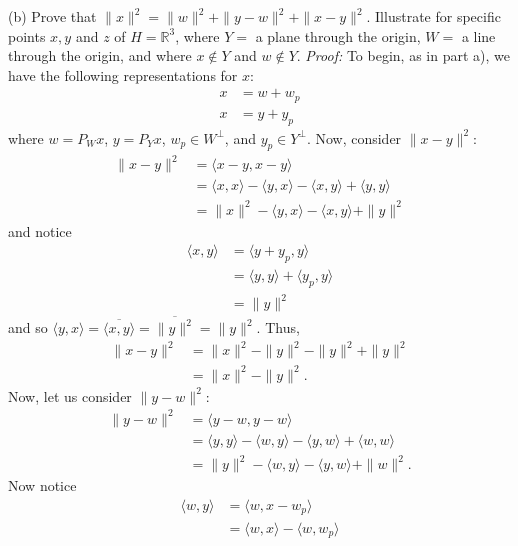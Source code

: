 \documentclass{article}
\begin{document}
\begin{itemize}
    
    (b) Prove that $\|x\|^2 = \|w\|^2 + \|y - w\|^2 + \|x - y\|^2$. Illustrate for specific points $x,y$ and $z$ of $H = \mathbb{R}^3$, where $Y = $ a plane through the origin, $W = $ a line through the origin, and where $x \notin Y$ and $w \notin Y$.
    \newline\newline
    \textit{Proof:} To begin, as in part a), we have the following representations for $x$:
    \begin{align*}
        x &= w + w_p\\
        x &= y + y_p
    \end{align*}
    where $w = P_Wx$, $y = P_Yx$, $w_p \in W^{\perp}$, and $y_p \in Y^{\perp}$. Now, consider $\|x - y\|^2$:
    \begin{align*}
        \|x - y\|^2 &= \langle x - y, x - y\rangle\\
        &= \langle x, x\rangle - \langle y, x\rangle - \langle x,y \rangle + \langle y, y \rangle\\
        &= \|x\|^2 - \langle y, x\rangle - \langle x, y\rangle + \|y\|^2
    \end{align*}
    and notice
    \begin{align*}
        \langle x, y\rangle &= \langle y + y_p, y\rangle\\
        &= \langle y, y\rangle + \langle y_p, y\rangle\\
        &= \|y\|^2
    \end{align*}
    and so $\langle y, x\rangle = \overline{\langle x,y\rangle} = \overline{\|y\|^2} = \|y\|^2$. Thus, 
    \begin{align*}
        \|x - y\|^2 &= \|x\|^2 - \|y\|^2 - \|y\|^2 + \|y\|^2\\
        &= \|x\|^2 - \|y\|^2.
    \end{align*}
    Now, let us consider $\|y - w\|^2$:
    \begin{align*}
        \|y - w\|^2 &= \langle y - w, y - w\rangle\\
        &= \langle y, y\rangle - \langle w, y\rangle - \langle y, w\rangle + \langle w, w\rangle\\
        &= \|y\|^2 - \langle w,y\rangle - \langle y,w\rangle + \|w\|^2.
    \end{align*}
    Now notice
    \begin{align*}
        \langle w, y\rangle &= \langle w, x - w_p\rangle \\
        &= \langle w, x\rangle - \langle w, w_p \rangle\\

\end{align*}
\end{itemize}
\end{document}
